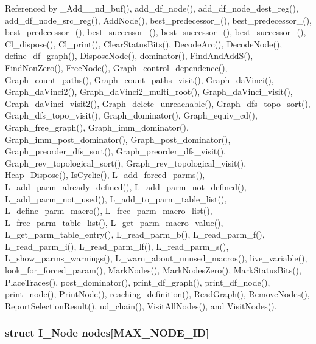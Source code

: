 Referenced by \_\-Add\_\_\-nd\_\-buf(), add\_\-df\_\-node(), add\_\-df\_\-node\_\-dest\_\-reg(), add\_\-df\_\-node\_\-src\_\-reg(), Add\-Node(), best\_\-predecessor\_(), best\_\-predecessor\_(), best\_\-predecessor\_(), best\_\-successor\_(), best\_\-successor\_(), best\_\-successor\_(), Cl\_\-dispose(), Cl\_\-print(), Clear\-Status\-Bits(), Decode\-Arc(), Decode\-Node(), define\_\-df\_\-graph(), Dispose\-Node(), dominator(), Find\-And\-Add\-S(), Find\-Non\-Zero(), Free\-Node(), Graph\_\-control\_\-dependence(), Graph\_\-count\_\-paths(), Graph\_\-count\_\-paths\_\-visit(), Graph\_\-da\-Vinci(), Graph\_\-da\-Vinci2(), Graph\_\-da\-Vinci2\_\-multi\_\-root(), Graph\_\-da\-Vinci\_\-visit(), Graph\_\-da\-Vinci\_\-visit2(), Graph\_\-delete\_\-unreachable(), Graph\_\-dfs\_\-topo\_\-sort(), Graph\_\-dfs\_\-topo\_\-visit(), Graph\_\-dominator(), Graph\_\-equiv\_\-cd(), Graph\_\-free\_\-graph(), Graph\_\-imm\_\-dominator(), Graph\_\-imm\_\-post\_\-dominator(), Graph\_\-post\_\-dominator(), Graph\_\-preorder\_\-dfs\_\-sort(), Graph\_\-preorder\_\-dfs\_\-visit(), Graph\_\-rev\_\-topological\_\-sort(), Graph\_\-rev\_\-topological\_\-visit(), Heap\_\-Dispose(), Is\-Cyclic(), L\_\-add\_\-forced\_\-parms(), L\_\-add\_\-parm\_\-already\_\-defined(), L\_\-add\_\-parm\_\-not\_\-defined(), L\_\-add\_\-parm\_\-not\_\-used(), L\_\-add\_\-to\_\-parm\_\-table\_\-list(), L\_\-define\_\-parm\_\-macro(), L\_\-free\_\-parm\_\-macro\_\-list(), L\_\-free\_\-parm\_\-table\_\-list(), L\_\-get\_\-parm\_\-macro\_\-value(), L\_\-get\_\-parm\_\-table\_\-entry(), L\_\-read\_\-parm\_\-b(), L\_\-read\_\-parm\_\-f(), L\_\-read\_\-parm\_\-i(), L\_\-read\_\-parm\_\-lf(), L\_\-read\_\-parm\_\-s(), L\_\-show\_\-parms\_\-warnings(), L\_\-warn\_\-about\_\-unused\_\-macros(), live\_\-variable(), look\_\-for\_\-forced\_\-param(), Mark\-Nodes(), Mark\-Nodes\-Zero(), Mark\-Status\-Bits(), Place\-Traces(), post\_\-dominator(), print\_\-df\_\-graph(), print\_\-df\_\-node(), print\_\-node(), Print\-Node(), reaching\_\-definition(), Read\-Graph(), Remove\-Nodes(), Report\-Selection\-Result(), ud\_\-chain(), Visit\-All\-Nodes(), and Visit\-Nodes().
\subsubsection{\setlength{\rightskip}{0pt plus 5cm}struct \bf{I\_\-Node} \bf{nodes}[MAX\_\-NODE\_\-ID]\hspace{0.3cm}{\tt  [static]}}\label{dataflow_8c_ae537a19454c5638b4ae21eb660d33df}




